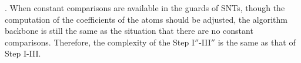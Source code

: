 . When constant comparisons are available in the guards of SNTs, though the computation of the coefficients of the atoms should be adjusted, the algorithm backbone is still the same as the situation that there are no constant comparisons. Therefore, the complexity of the Step I$''$-III$''$ is the same as that of Step I-III.

